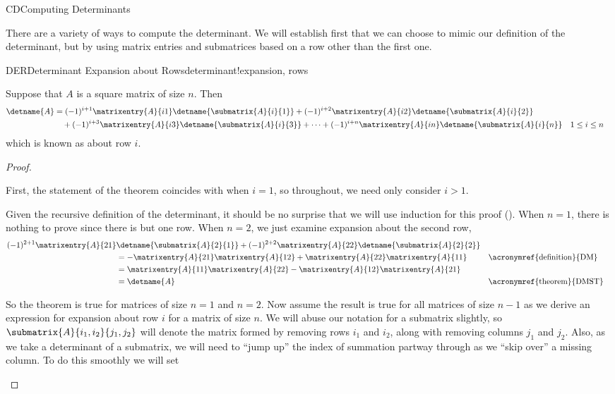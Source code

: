 \begin{subsect}{CD}{Computing Determinants}
%
\begin{para}There are a variety of ways to compute the determinant.  We will establish first that we can choose to mimic our definition of the determinant, but by using matrix entries and submatrices based on a row other than the first one.\end{para}
%
\begin{theorem}{DER}{Determinant Expansion about Rows}{determinant!expansion, rows}
\begin{para}Suppose that $A$ is a square matrix of size $n$.  Then
%
\begin{align*}
\detname{A}&=
(-1)^{i+1}\matrixentry{A}{i1}\detname{\submatrix{A}{i}{1}}+
(-1)^{i+2}\matrixentry{A}{i2}\detname{\submatrix{A}{i}{2}}\\
&\quad+(-1)^{i+3}\matrixentry{A}{i3}\detname{\submatrix{A}{i}{3}}+
\cdots+
(-1)^{i+n}\matrixentry{A}{in}\detname{\submatrix{A}{i}{n}}
&&
1\leq i\leq n
%
\end{align*}
%
which is known as  about row $i$.\end{para}
%
\end{theorem}
%
\begin{proof}
\begin{para}First, the statement of the theorem coincides with  when $i=1$, so throughout, we need only consider $i>1$.\end{para}
%
\begin{para}Given the recursive definition of the determinant, it should be no surprise that we will use induction for this proof ().  When $n=1$, there is nothing to prove since there is but one row.  When $n=2$, we just examine expansion about the second row,
%
\begin{align*}
(-1)^{2+1}\matrixentry{A}{21}&\detname{\submatrix{A}{2}{1}}+
(-1)^{2+2}\matrixentry{A}{22}\detname{\submatrix{A}{2}{2}}\\
&=-\matrixentry{A}{21}\matrixentry{A}{12}+\matrixentry{A}{22}\matrixentry{A}{11}
&&\text{\acronymref{definition}{DM}}\\
%
&=\matrixentry{A}{11}\matrixentry{A}{22}-\matrixentry{A}{12}\matrixentry{A}{21}\\
%
&=
\detname{A}&&\text{\acronymref{theorem}{DMST}}\\
\end{align*}
\end{para}
%
\begin{para}So the theorem is true for matrices of size $n=1$ and $n=2$.  Now assume the result is true for all matrices of size $n-1$ as we derive an expression for expansion about row $i$ for a matrix of size $n$.  We will abuse our notation for a submatrix slightly, so $\submatrix{A}{i_1,i_2}{j_1,j_2}$ will denote the matrix formed by removing rows $i_1$ and $i_2$, along with removing columns $j_1$ and $j_2$.  Also, as we take a determinant of a submatrix, we will need to ``jump up'' the index of summation partway through as we ``skip over'' a missing column.  To do this smoothly we will set

\end{para}
\end{proof}
\end{subsect}
